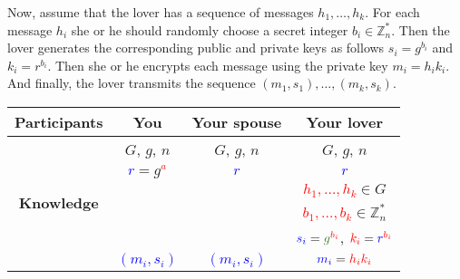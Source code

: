 Now, assume that the lover has a sequence of messages $h_1,\ldots, h_k$. For each message $h_i$ she or he should randomly choose a secret integer $b_i\in\mathbb Z_n^*$. Then the lover generates the corresponding public and private keys as follows $s_i = g^{b_i}$ and $k_i = r^{b_i}$. Then she or he encrypts each message using the private key $m_i = h_i k_i$. And finally, the lover transmits the sequence $(m_1, s_1),\ldots,(m_k, s_k)$.
\begin{center}
\begin{tabular}{|c|c|c|c|}
\hline
{\bf Participants}&{You}&{Your spouse}&{Your lover}\\
\hline
\multirow{6}{*}{\bf Knowledge}&{\textcolor{OliveGreen}{$G$}, \textcolor{OliveGreen}{$g$}, \textcolor{OliveGreen}{$n$}}&{\textcolor{OliveGreen}{$G$}, \textcolor{OliveGreen}{$g$}, \textcolor{OliveGreen}{$n$}}&{\textcolor{OliveGreen}{$G$}, \textcolor{OliveGreen}{$g$}, \textcolor{OliveGreen}{$n$}}\\
{}&{ \textcolor{blue}{$r$}$=$\textcolor{OliveGreen}{$ g$}\textcolor{red}{${}^a$}}&{\textcolor{blue}{$r$}}&{\textcolor{blue}{$r$}}\\
{}&{}&{}&{\textcolor{red}{$h_1,\ldots,h_k$}$\in G$}\\
{}&{}&{}&{\textcolor{red}{$b_1,\ldots,b_k$}$\in \mathbb Z_n^*$}\\
{}&{}&{}&{$\textcolor{blue}{s_i} = \textcolor{OliveGreen}{g}^{\textcolor{red}{b_i}}$, $\textcolor{red}{k_i} = \textcolor{blue}{r}^{\textcolor{red}{b_i}}$}\\
{}&{\textcolor{blue}{$(m_i, s_i)$}}&{\textcolor{blue}{$(m_i, s_i)$}}&{$\textcolor{blue}{m_i} = \textcolor{red}{h_i k_i}$}\\
\hline
\end{tabular}
\end{center}


